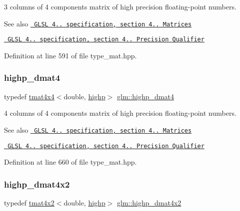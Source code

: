 3 columns of 4 components matrix of high precision floating-\/point numbers.

\begin{DoxySeeAlso}{See also}
\href{http://www.opengl.org/registry/doc/GLSLangSpec.4.20.8.pdf}{\texttt{ G\+L\+SL 4.. specification, section 4.. Matrices}} 

\href{http://www.opengl.org/registry/doc/GLSLangSpec.4.20.8.pdf}{\texttt{ G\+L\+SL 4.. specification, section 4.. Precision Qualifier}} 
\end{DoxySeeAlso}


Definition at line 591 of file type\+\_\+mat.\+hpp.

\mbox{\label{group__core__precision_ga457246aa7c671b1ed3dce700b3c1d4c0}} 
\subsubsection{\texorpdfstring{highp\_dmat4}{highp\_dmat4}}
{\footnotesize\ttfamily typedef \mbox{\hyperlink{structglm_1_1tmat4x4}{tmat4x4}}$<$double, \mbox{\hyperlink{namespaceglm_a0f04f086094c747d227af4425893f545ac6f7eab42eacbb10d59a58e95e362074}{highp}}$>$ \mbox{\hyperlink{group__core__precision_ga457246aa7c671b1ed3dce700b3c1d4c0}{glm\+::highp\+\_\+dmat4}}}

4 columns of 4 components matrix of high precision floating-\/point numbers.

\begin{DoxySeeAlso}{See also}
\href{http://www.opengl.org/registry/doc/GLSLangSpec.4.20.8.pdf}{\texttt{ G\+L\+SL 4.. specification, section 4.. Matrices}} 

\href{http://www.opengl.org/registry/doc/GLSLangSpec.4.20.8.pdf}{\texttt{ G\+L\+SL 4.. specification, section 4.. Precision Qualifier}} 
\end{DoxySeeAlso}


Definition at line 660 of file type\+\_\+mat.\+hpp.

\mbox{\label{group__core__precision_gaa0a2369be2e3d5a4db98cae345413dc1}} 
\subsubsection{\texorpdfstring{highp\_dmat4x2}{highp\_dmat4x2}}
{\footnotesize\ttfamily typedef \mbox{\hyperlink{structglm_1_1tmat4x2}{tmat4x2}}$<$double, \mbox{\hyperlink{namespaceglm_a0f04f086094c747d227af4425893f545ac6f7eab42eacbb10d59a58e95e362074}{highp}}$>$ \mbox{\hyperlink{group__core__precision_gaa0a2369be2e3d5a4db98cae345413dc1}{glm\+::highp\+\_\+dmat4x2}}}

